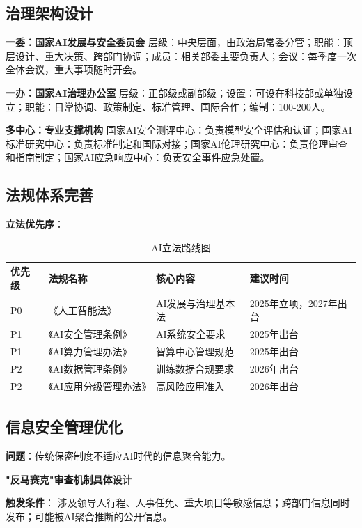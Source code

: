 \subsection{治理架构设计}

\textbf{一委：国家AI发展与安全委员会}
层级：中央层面，由政治局常委分管；职能：顶层设计、重大决策、跨部门协调；成员：相关部委主要负责人；会议：每季度一次全体会议，重大事项随时开会。

\textbf{一办：国家AI治理办公室}
层级：正部级或副部级；设置：可设在科技部或单独设立；职能：日常协调、政策制定、标准管理、国际合作；编制：100-200人。

\textbf{多中心：专业支撑机构}
国家AI安全测评中心：负责模型安全评估和认证；国家AI标准研究中心：负责标准制定和国际对接；国家AI伦理研究中心：负责伦理审查和指南制定；国家AI应急响应中心：负责安全事件应急处置。

\subsection{法规体系完善}

\textbf{立法优先序}：

\begin{table}[H]
\centering
\caption{AI立法路线图}
\small
\begin{tabular}{p{1.5cm}p{3cm}p{4cm}p{3.5cm}}
\toprule
\textbf{优先级} & \textbf{法规名称} & \textbf{核心内容} & \textbf{建议时间} \\
\midrule
P0 & 《人工智能法》 & AI发展与治理基本法 & 2025年立项，2027年出台 \\
P1 & 《AI安全管理条例》 & AI系统安全要求 & 2025年出台 \\
P1 & 《AI算力管理办法》 & 智算中心管理规范 & 2025年出台 \\
P2 & 《AI数据管理条例》 & 训练数据合规要求 & 2026年出台 \\
P2 & 《AI应用分级管理办法》 & 高风险应用准入 & 2026年出台 \\
\bottomrule
\end{tabular}
\end{table}

\subsection{信息安全管理优化}

\textbf{问题}：传统保密制度不适应AI时代的信息聚合能力。

\textbf{"反马赛克"审查机制具体设计}

\textbf{触发条件}：
涉及领导人行程、人事任免、重大项目等敏感信息；跨部门信息同时发布；可能被AI聚合推断的公开信息。

